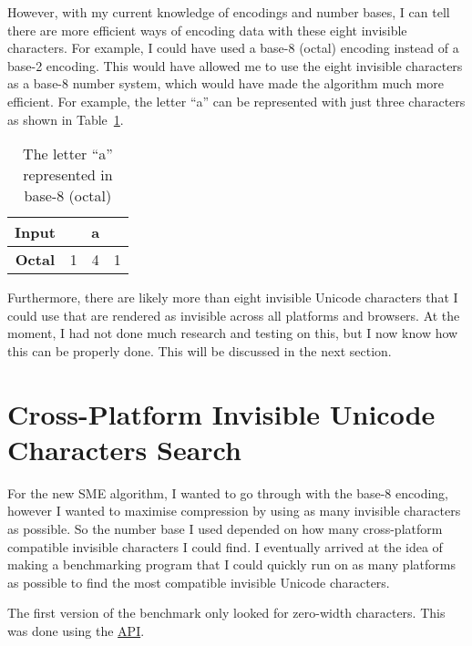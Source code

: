 \documentclass{article}
\begin{document}
However, with my current knowledge of encodings and number bases, I can tell there are more efficient ways of encoding data with these eight invisible characters. For example, I could have used a base-8 (octal) encoding instead of a base-2 encoding. This would have allowed me to use the eight invisible characters as a base-8 number system, which would have made the algorithm much more efficient. For example, the letter ``a'' can be represented with just three characters as shown in Table~\ref{tab:a-base8}.

\begin{table}[H]
  \centering
  \begin{tabular}{cccc}
    \textbf{Input} & \multicolumn{3}{c}{a} \\ \midrule
    \textbf{Octal} & 1 & 4 & 1             \\ \midrule
  \end{tabular}
  \caption{The letter ``a'' represented in base-8 (octal)}\label{tab:a-base8}
\end{table}

Furthermore, there are likely more than eight invisible Unicode characters that I could use that are rendered as invisible across all platforms and browsers. At the moment, I had not done much research and testing on this, but I now know how this can be properly done. This will be discussed in the next section.

\section{Cross-Platform Invisible Unicode Characters Search}

For the new SME algorithm, I wanted to go through with the base-8 encoding, however I wanted to maximise compression by using as many invisible characters as possible. So the number base I used depended on how many cross-platform compatible invisible characters I could find. I eventually arrived at the idea of making a benchmarking program that I could quickly run on as many platforms as possible to find the most compatible invisible Unicode characters.

The first version of the benchmark only looked for zero-width characters. This was done using the \href{https://developer.mozilla.org/en-US/docs/Web/API/Element/getBoundingClientRect}{ API}.
\end{document}
